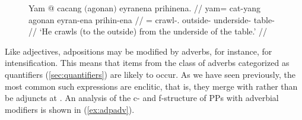 \begin{figure}
\ex\label{ex:nostackprep}\begingl
	\gla Yam @ cacang $($agonan$)$ eyranena prihinena. //
	\glb yam= cat-yang agonan eyran-ena prihin-ena //
	\glc \DatT{}= crawl-\TsgM{}.\Aarg{} outside-\Top{} underside-\Gen{}
		table-\Gen{} //
	\glft `He crawls (to the outside) from the underside of the table.' //
\endgl\xe
\end{figure}

Like adjectives, adpositions may be modified by adverbs, for instance, for
intensification. This means that items from the class of adverbs categorized as
quantifiers (\autoref{sec:quantifiers}) are likely to occur. As we have seen
previously, the most common such expressions are enclitic, that is, they merge
with  rather than be adjuncts at . An analysis of the c- and
f-structure of PPs with adverbial modifiers is shown in 
(\ref{ex:adpadv}).

